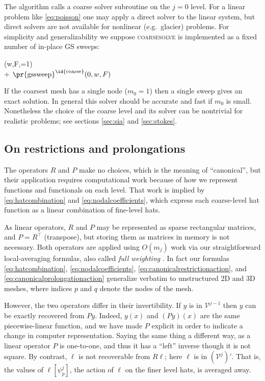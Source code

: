 \documentclass[letterpaper,final,12pt,reqno]{amsart}
\theoremstyle{claim}
\numberwithin{equation}{section}
\numberwithin{figure}{section}
\numberwithin{table}{section}
\numberwithin{theorem}{section}
\begin{document}
The algorithm calls a coarse solver subroutine on the $j=0$ level.  For a linear problem like \eqref{eq:poisson} one may apply a direct solver to the linear system, but direct solvers are not available for nonlinear (e.g.~glacier) problems.  For simplicity and generalizability we suppose \textsc{coarsesolve} is implemented as a fixed number of in-place GS sweeps:
\begin{pseudo*}
(w,F,=1)\text{:} \\+
    $\text{\pr{gssweep}}^{\text{\id{coarse}}}(0,w,F)$ \\
\end{pseudo*}
If the coarsest mesh has a single node ($m_0=1$) then a single sweep gives an exact solution.  In general this solver should be accurate and fast if $m_0$ is small.  Nonetheless the choice of the coarse level and its solver can be nontrivial for realistic problems; see sections \ref{sec:sia} and \ref{sec:stokes}.

\subsection*{On restrictions and prolongations}  The operators $R$ and $P$ make no choices, which is the meaning of ``canonical'', but their application requires computational work because of how we represent functions and functionals on each level.  That work is implied by \eqref{eq:hatcombination} and \eqref{eq:nodalcoefficients}, which express each coarse-level hat function as a linear combination of fine-level hats.

As linear operators, $R$ and $P$ may be represented as sparse rectangular matrices, and $P=R^\top$ (transpose), but storing them as matrices in memory is not necessary.  Both operators are applied using $O(m_j)$ work via our straightforward local-averaging formulas, also called \emph{full weighting} \cite{Briggsetal2000}.  In fact our formulas \eqref{eq:hatcombination}, \eqref{eq:nodalcoefficients}, \eqref{eq:canonicalrestrictionaction}, and \eqref{eq:canonicalprolongationaction} generalize verbatim to unstructured 2D and 3D meshes, where indices $p$ and $q$ denote the nodes of the mesh.

However, the two operators differ in their invertibility.  If $y$ is in $\mathcal{V}^{j-1}$ then $y$ can be exactly recovered from $Py$.  Indeed, $y(x)$ and $(Py)(x)$ are the same piecewise-linear function, and we have made $P$ explicit in order to indicate a change in computer representation.  Saying the same thing a different way, as a linear operator $P$ is one-to-one, and thus it has a ``left'' inverse though it is not square.  By contrast, $\ell$ is not recoverable from $R\ell$; here $\ell$ is in $(\mathcal{V}^j)'$.  That is, the values of $\ell[\psi_p^j]$, the action of $\ell$ on the finer level hats, is averaged away.
\end{document}
